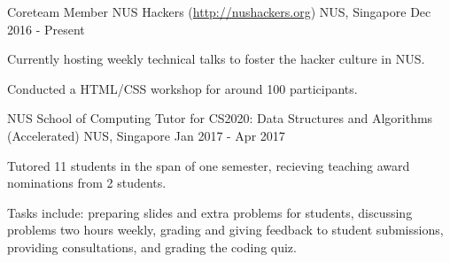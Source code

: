 

\begin{cventries}


  \cventry
  {Coreteam Member} %
  {NUS Hackers (\url{http://nushackers.org})} %
  {NUS, Singapore} %
  {Dec 2016 - Present} %
  { %
    \begin{cvitems}
    \item {Currently hosting weekly technical talks to foster the hacker culture in NUS.}
    \item {Conducted a HTML/CSS workshop for around 100 participants.}
    \end{cvitems}
  }


  \cventry
  {NUS School of Computing} %
  {Tutor for CS2020: Data Structures and Algorithms (Accelerated)} %
  {NUS, Singapore} %
  {Jan 2017 - Apr 2017} %
  { %
    \begin{cvitems}
    \item {Tutored 11 students in the span of one semester, recieving teaching award nominations from 2 students.}
    \item {Tasks include: preparing slides and extra problems for students, discussing problems two hours weekly, grading and giving feedback to student submissions, providing consultations, and grading the coding quiz.}
    \end{cvitems}
  }


\end{cventries}
